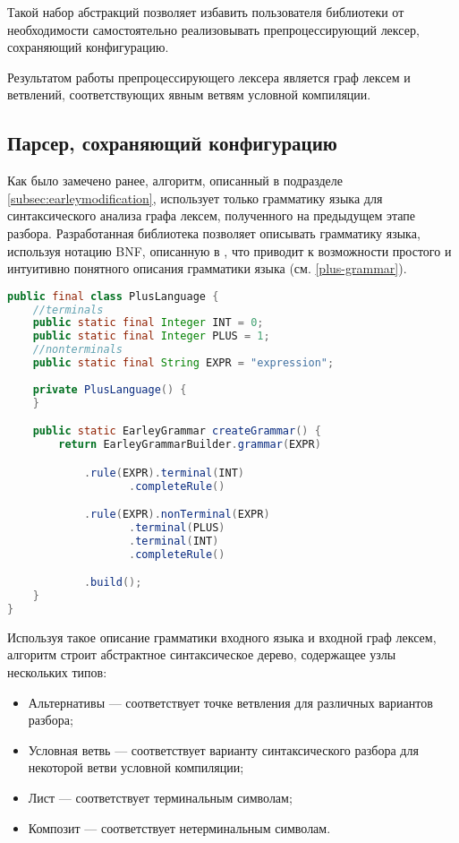 Такой набор абстракций позволяет избавить пользователя библиотеки от необходимости самостоятельно реализовывать препроцессирующий лексер, сохраняющий конфигурацию.

Результатом работы препроцессирующего лексера является граф лексем и ветвлений, соответствующих явным ветвям условной компиляции.

\subsection{Парсер, сохраняющий конфигурацию}

Как было замечено ранее, алгоритм, описанный в подразделе \ref{subsec:earleymodification}, использует только грамматику языка для синтаксического анализа графа лексем, полученного на предыдущем этапе разбора. Разработанная библиотека позволяет описывать грамматику языка, используя нотацию BNF, описанную в \cite{cfg}, что приводит к возможности простого и интуитивно понятного описания грамматики языка  (см. \autoref{plus-grammar}).

\begin{minipage}{\linewidth}
\begin{lstlisting}[caption={Пример описания грамматики простого языка.},label=plus-grammar,language=Java]
public final class PlusLanguage {
	//terminals
	public static final Integer INT = 0;
	public static final Integer PLUS = 1;
	//nonterminals
	public static final String EXPR = "expression";
	
	private PlusLanguage() {
	}

	public static EarleyGrammar createGrammar() {
		return EarleyGrammarBuilder.grammar(EXPR)

			.rule(EXPR).terminal(INT)
				   .completeRule()

			.rule(EXPR).nonTerminal(EXPR)
				   .terminal(PLUS)
				   .terminal(INT)
				   .completeRule()

			.build();
	}
}
\end{lstlisting}
\end{minipage}

Используя такое описание грамматики входного языка и входной граф лексем, алгоритм строит абстрактное синтаксическое дерево, содержащее узлы нескольких типов:

\begin{itemize}
\item Альтернативы --- соответствует точке ветвления для различных вариантов разбора;
\item Условная ветвь --- соответствует варианту синтаксического разбора для некоторой ветви условной компиляции;
\item Лист --- соответствует терминальным символам;
\item Композит --- соответствует нетерминальным символам.
\end{itemize}

